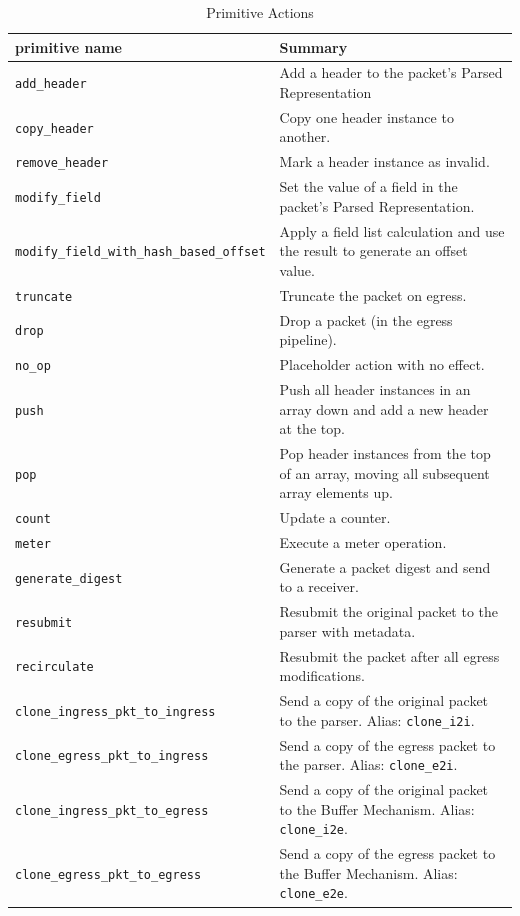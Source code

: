 \documentclass[12pt]{article}
\begin{document}
\begin{table}[H]
\begin{center}
\begin{tabular}{| l | p{} |} \hline
\textbf{primitive name} &
\textbf{Summary} \\ \hline
\texttt{add_header} &
Add a header to the packet's Parsed Representation \\ \hline
\texttt{copy_header} &
Copy one header instance to another. \\ \hline
\texttt{remove_header} &
Mark a header instance as invalid. \\ \hline
\texttt{modify_field} &
Set the value of a field in the packet's Parsed Representation. \\ \hline
\texttt{modify_field_with_hash_based_offset} &
Apply a field list calculation and use the result to generate an offset value. \\ \hline
\texttt{truncate} &
Truncate the packet on egress. \\ \hline
\texttt{drop} &
Drop a packet (in the egress pipeline). \\ \hline
\texttt{no_op} &
Placeholder action with no effect. \\ \hline
\texttt{push} &
Push all header instances in an array down and add a new header at the top. \\ \hline
\texttt{pop} &
Pop header instances from the top of an array, moving all subsequent array elements up. \\ \hline
\texttt{count} &
Update a counter. \\ \hline
\texttt{meter} &
Execute a meter operation. \\ \hline
\texttt{generate_digest} &
Generate a packet digest and send to a receiver. \\ \hline
\texttt{resubmit} &
Resubmit the original packet to the parser with metadata. \\ \hline
\texttt{recirculate} &
Resubmit the packet after all egress modifications. \\ \hline
\texttt{clone_ingress_pkt_to_ingress} &
Send a copy of the original packet to the parser. Alias: \texttt{clone_i2i}. \\ \hline
\texttt{clone_egress_pkt_to_ingress} &
Send a copy of the egress packet to the parser. Alias: \texttt{clone_e2i}. \\ \hline
\texttt{clone_ingress_pkt_to_egress} &
Send a copy of the original packet to the Buffer Mechanism. Alias: \texttt{clone_i2e}. \\ \hline
\texttt{clone_egress_pkt_to_egress} &
Send a copy of the egress packet to the Buffer Mechanism. Alias: \texttt{clone_e2e}. \\ \hline
\end{tabular}
\end{center}
\caption{Primitive Actions}
\label{tab:primitiveactions}
\end{table}
\end{document}

